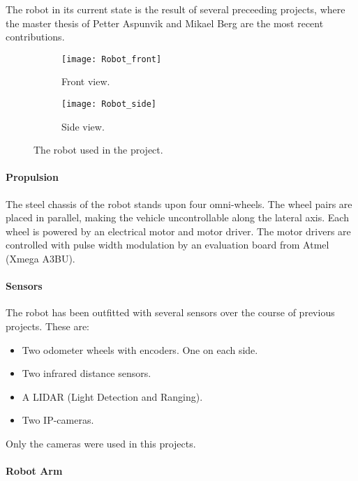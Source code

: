The robot in its current state is the result of several preceeding projects, where the master thesis of Petter Aspunvik \cite{aspunvik} and Mikael Berg \cite{berg} are the most recent contributions. 

\begin{figure}
\centering
 \begin{subfigure}[b]{0.3\textwidth}
        \texttt{[image: Robot\_front]}
        \caption{Front view.}
        \label{fig:RobotFront}
    \end{subfigure}
    \begin{subfigure}[b]{0.65\textwidth}
        \texttt{[image: Robot\_side]}
        \caption{Side view.}
        \label{fig:RobotSide}
    \end{subfigure}
    \caption{\label{fig:RobotView}The robot used in the project.}
\end{figure}

\paragraph{Propulsion}

The steel chassis of the robot stands upon four omni-wheels. The wheel pairs are placed in parallel, making the vehicle uncontrollable along the lateral axis. Each wheel is powered by an electrical motor and motor driver. The motor drivers are controlled with pulse width modulation by an evaluation board from Atmel (Xmega A3BU).  

\paragraph{Sensors}

The robot has been outfitted with several sensors over the course of previous projects. These are:
\begin{itemize}
	\item Two odometer wheels with encoders. One on each side. 
	\item Two infrared distance sensors. 
	\item A LIDAR (Light Detection and Ranging).
	\item Two IP-cameras.
\end{itemize} 

Only the cameras were used in this projects. 

\paragraph{Robot Arm}


